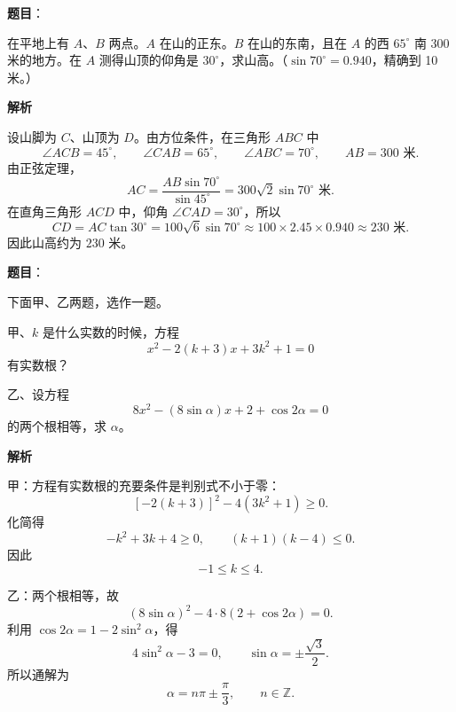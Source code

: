 \begin{answer}

\textbf{题目}：

在平地上有 $A$、$B$ 两点。$A$ 在山的正东。$B$ 在山的东南，且在 $A$ 的西 $65^\circ$ 南 $300$ 米的地方。在 $A$ 测得山顶的仰角是 $30^\circ$，求山高。（$\sin70^\circ=0.940$，精确到 10 米。）
\nopagebreak[4]
\begin{center}\end{center}
\nopagebreak[4]
\textbf{解析}

设山脚为 $C$、山顶为 $D$。由方位条件，在三角形 $ABC$ 中
\nopagebreak[4]
\[
\angle ACB=45^\circ,
\qquad \angle CAB=65^\circ,
\qquad \angle ABC=70^\circ,
\qquad AB=300\text{ 米}.
\]
由正弦定理，
\nopagebreak[4]
\[
AC=\frac{AB\sin70^\circ}{\sin45^\circ}
=300\sqrt2\sin70^\circ\text{ 米}.
\]
在直角三角形 $ACD$ 中，仰角 $\angle CAD=30^\circ$，所以
\nopagebreak[4]
\[
CD=AC\tan30^\circ
=100\sqrt6\sin70^\circ
\approx100\times2.45\times0.940
\approx230\text{ 米}.
\]
因此山高约为 $230$ 米。


\end{answer}
\begin{answer}

\textbf{题目}：

下面甲、乙两题，选作一题。

甲、$k$ 是什么实数的时候，方程
\nopagebreak[4]
\[
x^2-2(k+3)x+3k^2+1=0
\]
有实数根？

乙、设方程
\nopagebreak[4]
\[
8x^2-(8\sin\alpha)x+2+\cos2\alpha=0
\]
的两个根相等，求 $\alpha$。

\textbf{解析}

甲：方程有实数根的充要条件是判别式不小于零：
\nopagebreak[4]
\[
[-2(k+3)]^2-4(3k^2+1)\ge0.
\]
化简得
\nopagebreak[4]
\[
-k^2+3k+4\ge0,
\qquad (k+1)(k-4)\le0.
\]
因此
\nopagebreak[4]
\[
-1\le k\le4.
\]

乙：两个根相等，故
\nopagebreak[4]
\[
(8\sin\alpha)^2-4\cdot8(2+\cos2\alpha)=0.
\]
利用 $\cos2\alpha=1-2\sin^2\alpha$，得
\nopagebreak[4]
\[
4\sin^2\alpha-3=0,
\qquad \sin\alpha=\pm\frac{\sqrt3}{2}.
\]
所以通解为
\nopagebreak[4]
\[
\alpha=n\pi\pm\frac\pi3,
\qquad n\in\mathbb Z.
\]


\end{answer}